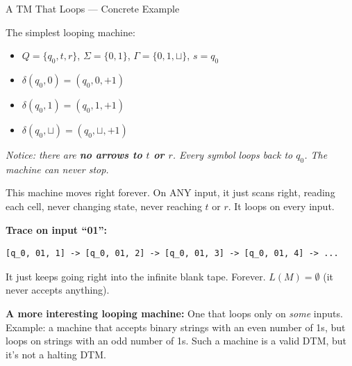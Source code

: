 \documentclass[11pt,a4paper]{article}
\begin{document}
\begin{examplebox}{A TM That Loops --- Concrete Example}

The simplest looping machine:
\begin{itemize}[nosep]
\item $Q = \{q_0, t, r\}$, $\Sigma = \{0, 1\}$, $\Gamma = \{0, 1, \sqcup\}$, $s = q_0$
\item $\delta(q_0, 0) = (q_0, 0, +1)$
\item $\delta(q_0, 1) = (q_0, 1, +1)$
\item $\delta(q_0, \sqcup) = (q_0, \sqcup, +1)$
\end{itemize}

\begin{center}
\end{center}

\textit{Notice: there are \textbf{no arrows to $t$ or $r$}. Every symbol loops back to $q_0$. The machine can never stop.}

This machine moves right forever. On ANY input, it just scans right, reading each cell, never changing state, never reaching $t$ or $r$. It loops on every input.

\textbf{Trace on input ``01'':}
\begin{lstlisting}
[q_0, 01, 1] -> [q_0, 01, 2] -> [q_0, 01, 3] -> [q_0, 01, 4] -> ...
\end{lstlisting}
It just keeps going right into the infinite blank tape. Forever. $L(M) = \emptyset$ (it never accepts anything).

\textbf{A more interesting looping machine:} One that loops only on \textit{some} inputs. Example: a machine that accepts binary strings with an even number of 1s, but loops on strings with an odd number of 1s. Such a machine is a valid DTM, but it's not a halting DTM.
\end{examplebox}


\newpage
\end{document}
